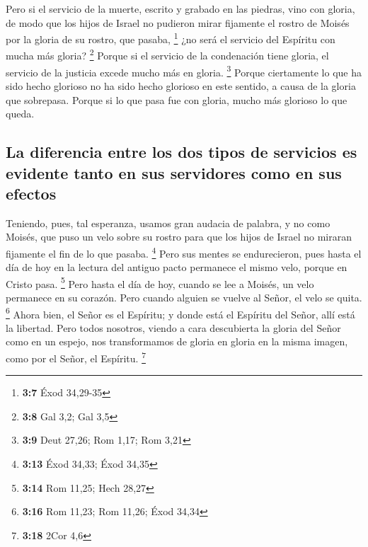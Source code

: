 \begin{paracol}{2}
 Pero si el servicio de la muerte, escrito y grabado en
las piedras, vino con gloria, de modo que los hijos de Israel no
pudieron mirar fijamente el rostro de Moisés por la gloria de su rostro,
que pasaba, \footnote{\textbf{3:7} Éxod 34,29-35}  ¿no
será el servicio del Espíritu con mucha más gloria? \footnote{\textbf{3:8}
  Gal 3,2; Gal 3,5}  Porque si el servicio de la
condenación tiene gloria, el servicio de la justicia excede mucho más en
gloria. \footnote{\textbf{3:9} Deut 27,26; Rom 1,17; Rom 3,21}
 Porque ciertamente lo que ha sido hecho glorioso no ha
sido hecho glorioso en este sentido, a causa de la gloria que sobrepasa.
 Porque si lo que pasa fue con gloria, mucho más glorioso
lo que queda.

\hypertarget{la-diferencia-entre-los-dos-tipos-de-servicios-es-evidente-tanto-en-sus-servidores-como-en-sus-efectos}{%
\subsection{La diferencia entre los dos tipos de servicios es evidente
tanto en sus servidores como en sus
efectos}\label{la-diferencia-entre-los-dos-tipos-de-servicios-es-evidente-tanto-en-sus-servidores-como-en-sus-efectos}}

 Teniendo, pues, tal esperanza, usamos gran audacia de
palabra,  y no como Moisés, que puso un velo sobre su
rostro para que los hijos de Israel no miraran fijamente el fin de lo
que pasaba. \footnote{\textbf{3:13} Éxod 34,33; Éxod 34,35}
 Pero sus mentes se endurecieron, pues hasta el día de
hoy en la lectura del antiguo pacto permanece el mismo velo, porque en
Cristo pasa. \footnote{\textbf{3:14} Rom 11,25; Hech 28,27}
 Pero hasta el día de hoy, cuando se lee a Moisés, un
velo permanece en su corazón.  Pero cuando alguien se
vuelve al Señor, el velo se quita. \footnote{\textbf{3:16} Rom 11,23;
  Rom 11,26; Éxod 34,34}  Ahora bien, el Señor es el
Espíritu; y donde está el Espíritu del Señor, allí está la libertad.
 Pero todos nosotros, viendo a cara descubierta la gloria
del Señor como en un espejo, nos transformamos de gloria en gloria en la
misma imagen, como por el Señor, el Espíritu. \footnote{\textbf{3:18}
  2Cor 4,6}

\switchcolumn
\begin{otherlanguage}{english}

\hypertarget{section-5}{%
}
\end{otherlanguage}
\end{paracol}

